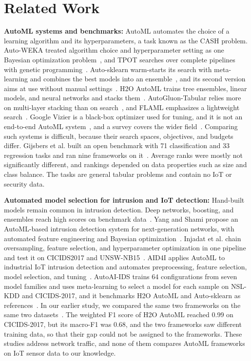 \section{Related Work}\label{sec:related}
\textbf{AutoML systems and benchmarks:} AutoML automates the choice of a learning algorithm and its hyperparameters, a task known as the CASH problem. Auto-WEKA treated algorithm choice and hyperparameter setting as one Bayesian optimization problem~\cite{thornton2013}, and TPOT searches over complete pipelines with genetic programming~\cite{olson2016}. Auto-sklearn warm-starts its search with meta-learning and combines the best models into an ensemble~\cite{feurer2015}, and its second version aims at use without manual settings~\cite{feurer2020}. H2O AutoML trains tree ensembles, linear models, and neural networks and stacks them~\cite{ledell2020}. AutoGluon-Tabular relies more on multi-layer stacking than on search~\cite{erickson2020}, and FLAML emphasizes a lightweight search~\cite{wang2019flaml}. Google Vizier is a black-box optimizer used for tuning, and it is not an end-to-end AutoML system~\cite{golovin2017}, and a survey covers the wider field~\cite{he2021}. Comparing such systems is difficult, because their search spaces, objectives, and budgets differ. Gijsbers et al. built an open benchmark with 71 classification and 33 regression tasks and ran nine frameworks on it~\cite{gijsbers2022}. Average ranks were mostly not significantly different, and rankings depended on data properties such as size and class balance. The tasks are general tabular problems and contain no IoT or security data.

\textbf{Automated model selection for intrusion and IoT detection:} Hand-built models remain common in intrusion detection. Deep networks, boosting, and ensembles reach high scores on benchmark data~\cite{vinayakumar2019,tama2019,bibers2024}. Yang and Shami propose an AutoML-based intrusion detection system for next-generation networks, with automated feature engineering and Bayesian optimization~\cite{yang2024automl}. Injadat et al. chain oversampling, feature selection, and hyperparameter optimization in one pipeline and test it on CICIDS2017 and UNSW-NB15~\cite{injadat2021}. AID4I applies AutoML to industrial IoT intrusion detection and automates preprocessing, feature selection, model selection, and tuning~\cite{sezgin2023}. AutoAI-IDS trains 64 configurations from seven model families and uses meta-learning to select a model for each sample on NSL-KDD and CICIDS-2017, and it benchmarks H2O AutoML and Auto-sklearn as references~\cite{guntur2025autoai}. In our earlier study, we compared the same two frameworks on the same two datasets~\cite{velnambi2026}. The weighted F1 score of H2O AutoML reached 0.99 on CICIDS-2017, but its macro-F1 was 0.68, and the two frameworks saw different training data, so that their gap could not be assigned to the frameworks. These studies address network traffic, and none of them compares AutoML frameworks on IoT sensor data to our knowledge.

